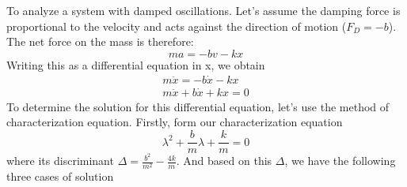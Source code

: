 \documentclass[math,code]{amznotes}
\theoremstyle{remark}
\begin{document}
To analyze a system with damped oscillations. Let's assume the damping force is proportional to the velocity and acts against the direction of motion ($F_D=-b$). The net force on the mass is therefore:
\begin{equation}
    ma=-bv-kx
\end{equation}
Writing this as a differential equation in x, we obtain
\begin{align}
    m\ddot{x}=-b\dot{x}-kx \\
    m\ddot{x}+b\dot{x}+kx=0
\end{align}
To determine the solution for this differential equation, let's use the method of characterization equation. Firstly, form our characterization equation
\begin{equation}
    \lambda^2+\frac{b}{m}\lambda+\frac{k}{m}=0
\end{equation}
where its discriminant $\Delta=\frac{b^2}{m^2}-\frac{4k}{m}$. And based on this $\Delta$, we have the following three cases of solution
\end{document}
